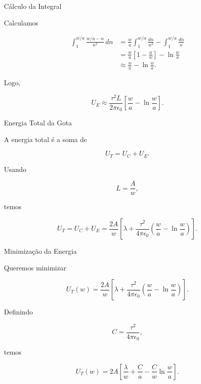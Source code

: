 \documentclass[aspectratio=169]{beamer}
\begin{document}
\begin{frame}{Cálculo da Integral}

Calculamos

\begin{align}
\int_1^{w/a}
\frac{w/a-n}{n^2}\,dn
&=
\frac{w}{a}
\int_1^{w/a}
\frac{dn}{n^2}
-
\int_1^{w/a}
\frac{dn}{n}
\\[0.2cm]
&=
\frac{w}{a}
\left[
1-\frac{a}{w}
\right]
-
\ln\frac{w}{a}
\\[0.2cm]
&\approx
\frac{w}{a}
-
\ln\frac{w}{a}.
\end{align}

Logo,

\begin{eqbox}
\begin{equation}
U_E
\approx
\frac{\tau^2L}{2\pi\epsilon_0}
\left[
\frac{w}{a}
-
\ln\frac{w}{a}
\right].
\tag{4.49}
\label{eq:4.49}
\end{equation}
\end{eqbox}

\end{frame}

\begin{frame}{Energia Total da Gota}

A energia total é a soma de

\[
U_T=U_C+U_E.
\]

Usando

\[
L=\frac{A}{w},
\]

temos

\begin{eqbox}
\begin{equation}
U_T
=
U_C+U_E
=
\frac{2A}{w}
\left[
\lambda
+
\frac{\tau^2}{4\pi\epsilon_0}
\left(
\frac{w}{a}
-
\ln\frac{w}{a}
\right)
\right].
\tag{4.50}
\label{eq:4.50}
\end{equation}
\end{eqbox}

\end{frame}

\begin{frame}{Minimização da Energia}

Queremos minimizar

\[
U_T(w)
=
\frac{2A}{w}
\left[
\lambda
+
\frac{\tau^2}{4\pi\epsilon_0}
\left(
\frac{w}{a}
-
\ln\frac{w}{a}
\right)
\right].
\]

Definindo

\[
C=\frac{\tau^2}{4\pi\epsilon_0},
\]

temos

\[
U_T(w)
=
2A
\left[
\frac{\lambda}{w}
+
\frac{C}{a}
-
\frac{C}{w}\ln\frac{w}{a}
\right].
\]

\end{frame}
\end{document}
